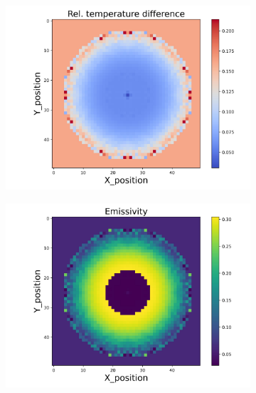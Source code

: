 \begin{figure}[htbp]
    \centering
    \begin{minipage}{\textwidth}
        \centering
        \begin{subfigure}{0.49\textwidth}
            \centering
            \includegraphics[width=\textwidth]{figures/raw_data/21/lin_square/T_bias.jpg}
        \end{subfigure}
        \begin{subfigure}{0.49\textwidth}
            \centering
            \includegraphics[width=\textwidth]{figures/raw_data/21/lin_square/emi_cal.jpg}
        \end{subfigure}
    \end{minipage}\\

\end{figure}
